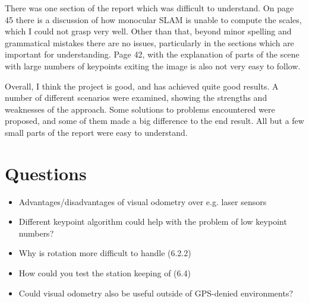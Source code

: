\documentclass[11pt,a4paper]{article}
\begin{document}
There was one section of the report which was difficult to understand. On page
45 there is a discussion of how monocular SLAM is unable to compute the scales,
which I could not grasp very well. Other than that, beyond minor spelling and
grammatical mistakes there are no issues, particularly in the sections which are
important for understanding. Page 42, with the explanation of parts of the scene
with large numbers of keypoints exiting the image is also not very easy to follow.

Overall, I think the project is good, and has achieved quite good results. A
number of different scenarios were examined, showing the strengths and
weaknesses of the approach. Some solutions to problems encountered were
proposed, and some of them made a big difference to the end result. All but a
few small parts of the report were easy to understand.

\section*{Questions}
  \begin{itemize}
  \item Advantages/disadvantages of visual odometry over e.g. laser sensors
  \item Different keypoint algorithm could help with the problem of low
    keypoint numbers?
  \item Why is rotation more difficult to handle (6.2.2)
  \item How could you test the station keeping of (6.4)
  \item Could visual odometry also be useful outside of GPS-denied environments?
  \end{itemize}
\end{document}

